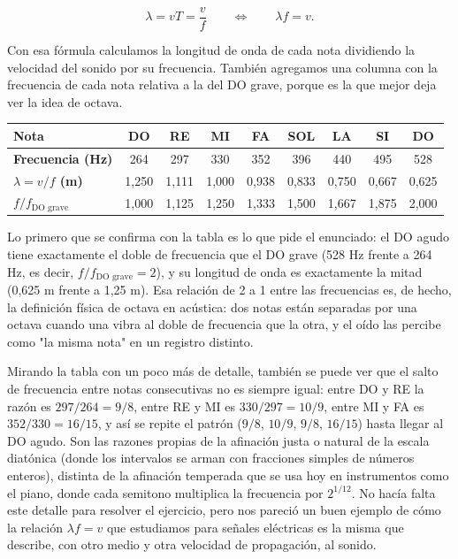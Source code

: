 \documentclass[11pt,a4paper]{article}
\begin{document}
\[
  \lambda = vT = \frac{v}{f} \qquad \Longleftrightarrow \qquad \lambda f = v.
\]

Con esa fórmula calculamos la longitud de onda de cada nota dividiendo la velocidad del sonido por su frecuencia. También agregamos una columna con la frecuencia de cada nota relativa a la del DO grave, porque es la que mejor deja ver la idea de octava.

\begin{center}
\begin{tabular}{|l|c|c|c|c|c|c|c|c|}
\hline
\textbf{Nota} & DO & RE & MI & FA & SOL & LA & SI & DO \\
\hline
\textbf{Frecuencia (Hz)} & 264 & 297 & 330 & 352 & 396 & 440 & 495 & 528 \\
\hline
\textbf{$\lambda = v/f$ (m)} & 1{,}250 & 1{,}111 & 1{,}000 & 0{,}938 & 0{,}833 & 0{,}750 & 0{,}667 & 0{,}625 \\
\hline
\textbf{$f/f_{\text{DO grave}}$} & 1{,}000 & 1{,}125 & 1{,}250 & 1{,}333 & 1{,}500 & 1{,}667 & 1{,}875 & 2{,}000 \\
\hline
\end{tabular}
\end{center}

Lo primero que se confirma con la tabla es lo que pide el enunciado: el DO agudo tiene exactamente el doble de frecuencia que el DO grave (528 Hz frente a 264 Hz, es decir, $f/f_{\text{DO grave}}=2$), y su longitud de onda es exactamente la mitad (0,625 m frente a 1,25 m). Esa relación de 2 a 1 entre las frecuencias es, de hecho, la definición física de octava en acústica: dos notas están separadas por una octava cuando una vibra al doble de frecuencia que la otra, y el oído las percibe como "la misma nota" en un registro distinto.

Mirando la tabla con un poco más de detalle, también se puede ver que el salto de frecuencia entre notas consecutivas no es siempre igual: entre DO y RE la razón es $297/264 = 9/8$, entre RE y MI es $330/297 = 10/9$, entre MI y FA es $352/330 = 16/15$, y así se repite el patrón ($9/8$, $10/9$, $9/8$, $16/15$) hasta llegar al DO agudo. Son las razones propias de la afinación justa o natural de la escala diatónica (donde los intervalos se arman con fracciones simples de números enteros), distinta de la afinación temperada que se usa hoy en instrumentos como el piano, donde cada semitono multiplica la frecuencia por $2^{1/12}$. No hacía falta este detalle para resolver el ejercicio, pero nos pareció un buen ejemplo de cómo la relación $\lambda f = v$ que estudiamos para señales eléctricas es la misma que describe, con otro medio y otra velocidad de propagación, al sonido.
\end{document}
